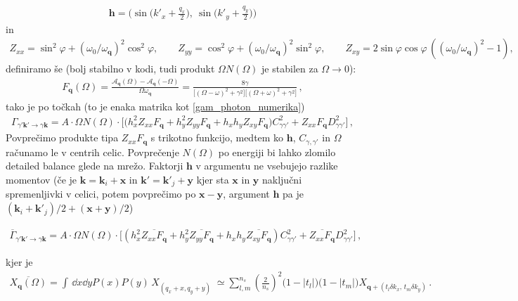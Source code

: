 \documentclass[a4paper,10pt]{article}
\renewcommand{\vec}[1]{\mathbf{#1}}
\begin{document}
\begin{align}
  \vec h=\Big(\sin\big(k'_x+\tfrac{q_x}{2}\big),\ \sin\big(k'_y+\tfrac{q_y}{2}\big)\Big)
\end{align}
in
\begin{align}
  Z_{xx}=\sin^2\!\varphi+(\omega_0/\omega_{\vec q})^2\cos^2\!\varphi,\qquad Z_{yy}=\cos^2\!\varphi+(\omega_0/\omega_{\vec q})^2\sin^2\!\varphi,\qquad Z_{xy}=2\sin\varphi\cos\varphi\,((\omega_0/\omega_{\vec q})^2-1),
\end{align}
definiramo še (bolj stabilno v kodi, tudi produkt $\Omega N(\Omega)$ je stabilen za $\Omega \to 0$):
\begin{align}
  F_\vec{q}(\Omega)=\frac{\mathcal{A}_{\vec q}(\Omega)-\mathcal{A}_{\vec q}(-\Omega)}{\Omega\omega_{\vec q}}= \frac{8\gamma}{\big[(\Omega-\omega)^2+\gamma^2\big]\big[(\Omega+\omega)^2+\gamma^2\big]}\,,
\end{align}
tako je po točkah (to je enaka matrika kot \eqref{gam_photon_numerika})
\begin{align}
  \Gamma_{\gamma'\vec{k}'\to\gamma \vec{k}}=A \cdot \Omega N(\Omega) \cdot \Big[\big(h_x^2Z_{xx}F_{\vec q}+h_y^2Z_{yy}F_{\vec q}+h_xh_yZ_{xy}F_{\vec q}\big)C_{\gamma\gamma'}^2+Z_{xx}F_{\vec q}D_{\gamma\gamma'}^2\Big]\,,
\end{align}
Povprečimo produkte tipa $Z_{xx}F_{\vec q}$ s trikotno funkcijo, medtem ko $\vec h$, $C_{\gamma, \gamma'}$ in $\Omega$ računamo le v centrih celic. Povprečenje $N(\Omega)$ po energiji bi lahko zlomilo detailed balance glede na mrežo. Faktorji $\vec h$ v argumentu ne vsebujejo razlike momentov (če je $\vec k = \vec{k}_i + \vec{x}$ in $\vec k' = \vec{k}'_j + \vec{y}$ kjer sta $\vec{x}$ in $\vec y$ naključni spremenljivki v celici, potem povprečimo po $\vec{x}-\vec{y}$, argument $\vec{h}$ pa je $(\vec{k}_i +\vec{k}'_j)/2 + (\vec{x}+\vec{y})/2$) 
\begin{tcolorbox}
\begin{align}
  \overline\Gamma_{\gamma'\vec k'\to\gamma \vec k}=A \cdot \Omega N(\Omega)\cdot  \Big[\left(h_x^2 \overline{Z_{xx}F_{\vec q}}+h_y^2 \overline{Z_{yy}F_{\vec q}}+h_xh_y \overline{Z_{xy}F_{\vec q}}\right)C_{\gamma\gamma'}^2+ \overline{Z_{xx}F_{\vec q}} D_{\gamma\gamma'}^2\Big]\,,
\end{align}
\end{tcolorbox} \noindent
kjer je 
\begin{align}
  \overline{X_{\vec{q}}(\Omega)} =\int\,\dd{x}\dd{y}P(x)P(y)\,X_{(q_x + x, q_y + y)}\;\simeq\sum_{l,m}^{n_s}\left( \frac{2}{n_s}\right)^2\big(1-|t_l|\big)\big(1-|t_m|\big)X_{\vec{q}+(t_l\delta k_x,\,t_m\delta k_y)}\,.
\end{align}
\end{document}
